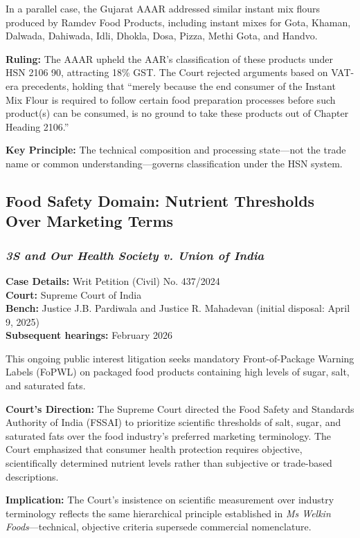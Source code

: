 \documentclass[12pt,a4paper]{article}
\begin{document}
In a parallel case, the Gujarat AAAR addressed similar instant mix flours produced by Ramdev Food Products, including instant mixes for Gota, Khaman, Dalwada, Dahiwada, Idli, Dhokla, Dosa, Pizza, Methi Gota, and Handvo.

\textbf{Ruling:} The AAAR upheld the AAR's classification of these products under HSN 2106 90, attracting 18\% GST. The Court rejected arguments based on VAT-era precedents, holding that ``merely because the end consumer of the Instant Mix Flour is required to follow certain food preparation processes before such product(s) can be consumed, is no ground to take these products out of Chapter Heading 2106.''

\textbf{Key Principle:} The technical composition and processing state---not the trade name or common understanding---governs classification under the HSN system.

\subsection{Food Safety Domain: Nutrient Thresholds Over Marketing Terms}

\subsubsection{\textit{3S and Our Health Society v. Union of India}}

\textbf{Case Details:} Writ Petition (Civil) No. 437/2024\\
\textbf{Court:} Supreme Court of India\\
\textbf{Bench:} Justice J.B. Pardiwala and Justice R. Mahadevan (initial disposal: April 9, 2025)\\
\textbf{Subsequent hearings:} February 2026

This ongoing public interest litigation seeks mandatory Front-of-Package Warning Labels (FoPWL) on packaged food products containing high levels of sugar, salt, and saturated fats.

\textbf{Court's Direction:} The Supreme Court directed the Food Safety and Standards Authority of India (FSSAI) to prioritize scientific thresholds of salt, sugar, and saturated fats over the food industry's preferred marketing terminology. The Court emphasized that consumer health protection requires objective, scientifically determined nutrient levels rather than subjective or trade-based descriptions.

\textbf{Implication:} The Court's insistence on scientific measurement over industry terminology reflects the same hierarchical principle established in \textit{Ms Welkin Foods}---technical, objective criteria supersede commercial nomenclature.
\end{document}
